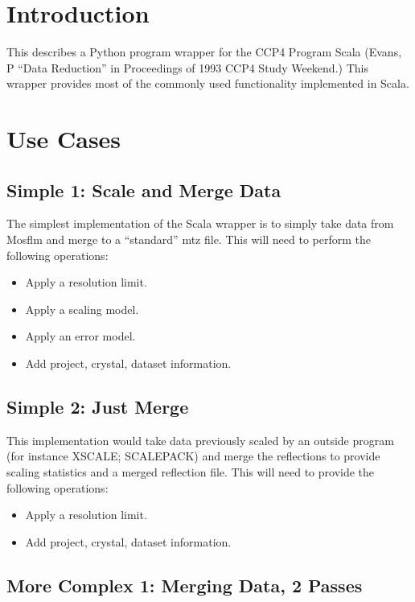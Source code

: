 \documentclass[a4paper, 11pt]{article}
\begin{document}
\section{Introduction}

This describes a Python program wrapper for the CCP4 Program Scala
(Evans, P ``Data Reduction'' in Proceedings of 1993 CCP4 Study Weekend.)
This wrapper provides most of the commonly used functionality implemented
in Scala.

\section{Use Cases}

\subsection{Simple 1: Scale and Merge Data}

The simplest implementation of the Scala wrapper is to simply take data 
from Mosflm and merge to a ``standard'' mtz file. This will need to perform
the following operations:

\begin{itemize}
\item{Apply a resolution limit.}
\item{Apply a scaling model.}
\item{Apply an error model.}
\item{Add project, crystal, dataset information.}
\end{itemize}

\subsection{Simple 2: Just Merge}

This implementation would take data previously scaled by an outside program
(for instance XSCALE; SCALEPACK) and merge the reflections to provide
scaling statistics and a merged reflection file. This will need to provide
the following operations:

\begin{itemize}
\item{Apply a resolution limit.}
\item{Add project, crystal, dataset information.}
\end{itemize}

\subsection{More Complex 1: Merging Data, 2 Passes}
\end{document}
